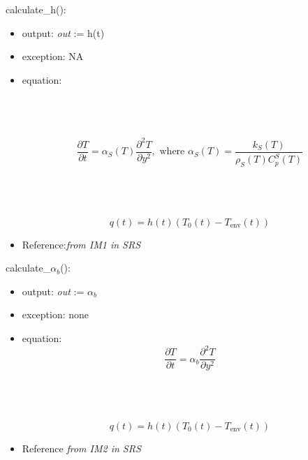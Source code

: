\documentclass[12pt, titlepage]{article}
\begin{document}
\noindent calculate\_h():
\begin{itemize}
\item output: \textit{out} := h(t)
\item exception: NA
\item equation:

\\
\\
\\
\begin{equation*}
\frac{\partial T}{\partial t} = \alpha_S(T) \frac{\partial^2 T}{\partial y^2},
\mbox{ where } \alpha_S(T) = \frac{k_S(T)}{\rho_S(T) C_p^S(T)}
\end{equation*}

\\
\\
\\

\begin{equation*}
q(t) = h(t)(T_0(t) - T_{\text{env}}(t))
\end{equation*}

\item Reference:\textit{from IM1 in SRS}           

\end{itemize}

\noindent calculate\_$\alpha_b$():

\begin{itemize}
\item output: \textit{out} := $\alpha_b$
\item exception: none
\item equation:
\\          
\begin{equation*}
\frac{\partial T}{\partial t} = \alpha_b \frac{\partial^2 T}{\partial y^2}
\end{equation*}

\\
\\
\\

\begin{equation*}
 q(t) = h(t)(T_0(t) - T_{\text{env}}(t))
 \end{equation*}
         
\item Reference \textit{from IM2 in SRS}  

\end{itemize}
\end{document}
